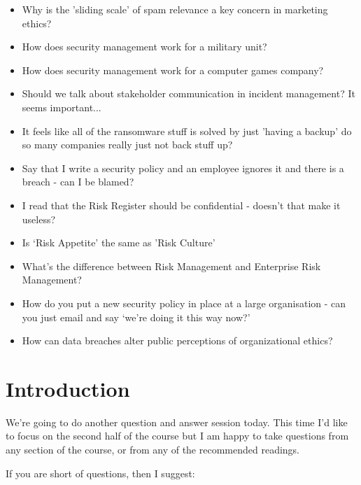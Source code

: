 \documentclass[12pt]{article}
\begin{document}
\begin{itemize}
  \item Why is the 'sliding scale' of spam relevance a key concern in marketing ethics?
  \item How does security management work for a military unit?
  \item How does security management work for a computer games company?
  \item Should we talk about stakeholder communication in incident management? It seems important...
  \item It feels like all of the ransomware stuff is solved by just 'having a backup' do so many companies really just not back stuff up?
  \item Say that I write a security policy and an employee ignores it and there is a breach - can I be blamed?
  \item I read that the Risk Register should be confidential - doesn't that make it useless?
  \item Is `Risk Appetite' the same as 'Risk Culture'
  \item What's the difference between Risk Management and Enterprise Risk Management?
  \item How do you put a new security policy in place at a large organisation - can you just email and say `we're doing it this way now?'
  \item How can data breaches alter public perceptions of organizational ethics?
\end{itemize}


%
%



\maketitle

\section*{Introduction}
We're going to do another question and answer session today. This time I'd like to focus on the second half of the course but I am happy to take questions from any section of the course, or from any of the recommended readings. 

If you are short of questions, then I suggest: 
\end{document}
